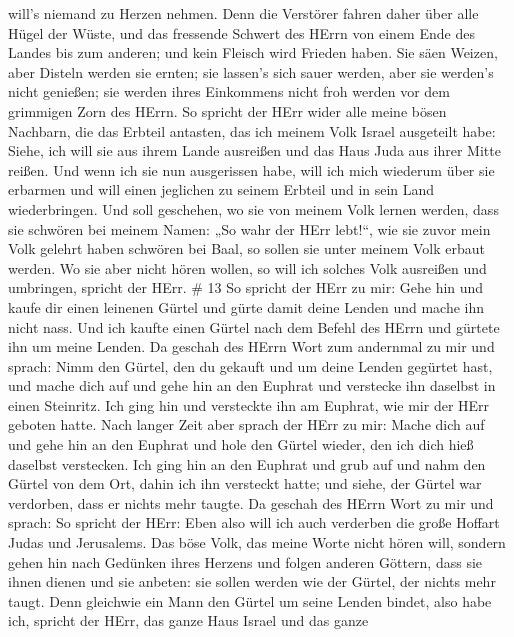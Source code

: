 will's niemand zu Herzen nehmen.  Denn die Verstörer fahren
daher über alle Hügel der Wüste, und das fressende Schwert des HErrn von
einem Ende des Landes bis zum anderen; und kein Fleisch wird Frieden
haben.  Sie säen Weizen, aber Disteln werden sie ernten;
sie lassen's sich sauer werden, aber sie werden's nicht genießen; sie
werden ihres Einkommens nicht froh werden vor dem grimmigen Zorn des
HErrn.  So spricht der HErr wider alle meine bösen
Nachbarn, die das Erbteil antasten, das ich meinem Volk Israel
ausgeteilt habe: Siehe, ich will sie aus ihrem Lande ausreißen und das
Haus Juda aus ihrer Mitte reißen.  Und wenn ich sie nun
ausgerissen habe, will ich mich wiederum über sie erbarmen und will
einen jeglichen zu seinem Erbteil und in sein Land wiederbringen.
 Und soll geschehen, wo sie von meinem Volk lernen werden,
dass sie schwören bei meinem Namen: „So wahr der HErr lebt!{}``, wie sie
zuvor mein Volk gelehrt haben schwören bei Baal, so sollen sie unter
meinem Volk erbaut werden.  Wo sie aber nicht hören wollen,
so will ich solches Volk ausreißen und umbringen, spricht der HErr. \#
13  So spricht der HErr zu mir: Gehe hin und kaufe dir einen
leinenen Gürtel und gürte damit deine Lenden und mache ihn nicht nass.
 Und ich kaufte einen Gürtel nach dem Befehl des HErrn und
gürtete ihn um meine Lenden.  Da geschah des HErrn Wort zum
andernmal zu mir und sprach:  Nimm den Gürtel, den du
gekauft und um deine Lenden gegürtet hast, und mache dich auf und gehe
hin an den Euphrat und verstecke ihn daselbst in einen Steinritz.
 Ich ging hin und versteckte ihn am Euphrat, wie mir der
HErr geboten hatte.  Nach langer Zeit aber sprach der HErr
zu mir: Mache dich auf und gehe hin an den Euphrat und hole den Gürtel
wieder, den ich dich hieß daselbst verstecken.  Ich ging hin
an den Euphrat und grub auf und nahm den Gürtel von dem Ort, dahin ich
ihn versteckt hatte; und siehe, der Gürtel war verdorben, dass er nichts
mehr taugte.  Da geschah des HErrn Wort zu mir und sprach:
 So spricht der HErr: Eben also will ich auch verderben die
große Hoffart Judas und Jerusalems.  Das böse Volk, das
meine Worte nicht hören will, sondern gehen hin nach Gedünken ihres
Herzens und folgen anderen Göttern, dass sie ihnen dienen und sie
anbeten: sie sollen werden wie der Gürtel, der nichts mehr taugt.
 Denn gleichwie ein Mann den Gürtel um seine Lenden bindet,
also habe ich, spricht der HErr, das ganze Haus Israel und das ganze
